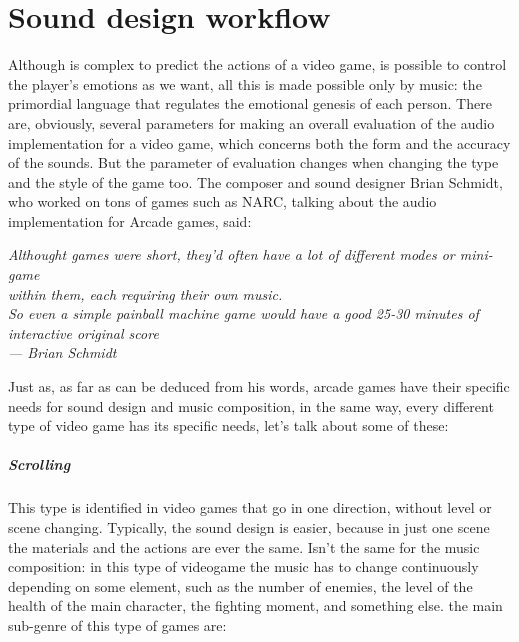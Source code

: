
\chapter{Sound design workflow}
\label{chp:intro}

Although is complex to predict the actions of a video game, is possible to control the player's emotions as we want, all this is made possible only by music: the primordial language that regulates the emotional genesis of each person.
There are, obviously, several parameters for making an overall evaluation of the audio implementation for a video game, which concerns both the form and the accuracy of the sounds.
But the parameter of evaluation changes when changing the type and the style of the game too.
The composer and sound designer Brian Schmidt, who worked on tons of games such as NARC, talking about the audio implementation for Arcade games, said:
\begin{flushright}
	\itshape
	Althought games were short, they'd often have a lot of different modes or mini-game \\
	within them, each requiring their own music. \\
	So even a simple painball machine game would have a good 25-30 minutes of interactive original score\\
	\medskip
	--- Brian Schmidt
\end{flushright}

Just as, as far as can be deduced from his words, arcade games have their specific needs for sound design and music composition, in the same way, every different type of video game has its specific needs, let's talk about some of these:

	\paragraph{Scrolling} This type is identified in video games that go in one direction, without level or scene changing. Typically, the sound design is easier, because in just one scene the materials and the actions are ever the same. Isn't the same for the music composition: in this type of videogame the music has to change continuously depending on some element, such as the number of enemies, the level of the health of the main character, the fighting moment, and something else. the main sub-genre of this type of games are:
	
